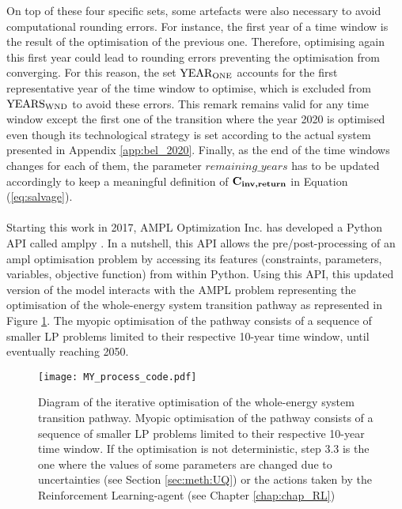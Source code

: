 On top of these four specific sets, some artefacts were also necessary to avoid computational rounding errors. For instance, the first year of a time window is the result of the optimisation of the previous one. Therefore, optimising again this first year could lead to rounding errors preventing the optimisation from converging. For this reason,  the set $\text{YEAR}\textsubscript{ONE}$ accounts for the first representative year of the time window to optimise, which is excluded from $\text{YEARS}\textsubscript{WND}$ to avoid these errors. This remark remains valid for any time window except the first one of the transition where the year 2020 is optimised even though its technological strategy is set according to the actual system presented in Appendix \ref{app:bel_2020}. Finally, as the end of the time windows changes for each of them, the parameter $remaining\_years$ has to be updated accordingly to keep a meaningful definition of $\textbf{C\textsubscript{inv,return}}$ in Equation (\ref{eq:salvage}).\\

\\

\noindent
Starting this work in 2017, AMPL Optimization Inc. has developed a Python \gls{API} called amplpy \cite{amplpy}. In a nutshell, this API allows the pre/post-processing of an ampl optimisation problem by accessing its features (\eg constraints, parameters, variables, objective function) from within Python. Using this \gls{API}, this updated version of the model interacts with the AMPL problem representing the optimisation of the whole-energy system transition pathway as represented in Figure \ref{fig:MY_process_code}. The myopic optimisation of the pathway consists of a sequence of smaller \gls{LP} problems limited to their respective 10-year time window, until eventually reaching 2050.\\


\begin{figure}[htbp!]
\centering
\texttt{[image: MY\_process\_code.pdf]}
\caption{Diagram of the iterative optimisation of the whole-energy system transition pathway. Myopic optimisation of the pathway consists of a sequence of smaller \gls{LP} problems limited to their respective 10-year time window. If the optimisation is not deterministic, step 3.3 is the one where the values of some parameters are changed due to uncertainties (see Section \ref{sec:meth:UQ}) or the actions taken by the Reinforcement Learning-agent (see Chapter \ref{chap:chap_RL})}
\label{fig:MY_process_code}
\end{figure}

